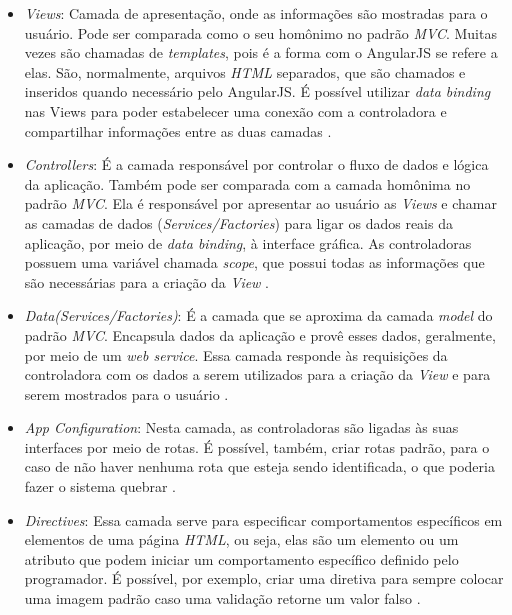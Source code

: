 \begin{itemize}
    \item \textit{Views}: Camada de apresentação, onde as informações são mostradas para o usuário. Pode ser comparada como 
    o seu homônimo no padrão \textit{MVC}. Muitas vezes são chamadas de \textit{templates}, pois é a forma com o AngularJS 
    se refere a elas. São, normalmente, arquivos \textit{HTML} separados, que são chamados e inseridos quando necessário pelo
    AngularJS. É possível utilizar \textit{data binding} nas Views para poder estabelecer uma conexão com a controladora
    e compartilhar informações entre as duas camadas \cite{drifty_ionic_2016}.
    \item \textit{Controllers}: É a camada responsável por controlar o fluxo de dados e lógica da aplicação. Também pode ser
    comparada com a camada homônima no padrão \textit{MVC}. Ela é responsável por apresentar ao usuário as \textit{Views} e chamar as camadas
    de dados (\textit{Services/Factories}) para ligar os dados reais da aplicação, por meio de \textit{data binding}, à interface
    gráfica. As controladoras possuem uma variável chamada \textit{scope}, que possui todas as informações que são necessárias 
    para a criação da \textit{View} \cite{drifty_ionic_2016}.
    \item \textit{Data(Services/Factories)}: É a camada que se aproxima da camada \textit{model} do padrão \textit{MVC}. Encapsula
    dados da aplicação e provê esses dados, geralmente, por meio de um \textit{web service}. Essa camada responde às requisições
    da controladora com os dados a serem utilizados para a criação da \textit{View} e para serem mostrados para o usuário \cite{drifty_ionic_2016}. 
    \item \textit{App Configuration}: Nesta camada, as controladoras são ligadas às suas interfaces por meio de rotas. É possível,
    também, criar rotas padrão, para o caso de não haver nenhuma rota que esteja sendo identificada, o que poderia fazer o sistema quebrar \cite{drifty_ionic_2016}.
    \item \textit{Directives}: Essa camada serve para especificar comportamentos específicos em elementos de uma página 
    \textit{HTML}, ou seja, elas são um elemento ou um atributo que podem iniciar um comportamento específico definido 
    pelo programador. É possível, por exemplo, criar uma diretiva para sempre colocar uma imagem padrão caso uma validação 
    retorne um valor falso \cite{drifty_ionic_2016}.
\end{itemize}

